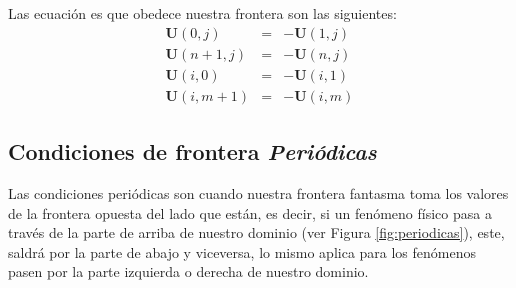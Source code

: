 \documentclass[12pt,a4paper]{book}
\begin{document}
Las ecuación  es que obedece nuestra frontera son las siguientes:
\begin{eqnarray}
\textbf{U}(0,j)&=&-\textbf{U}(1,j) \\
\textbf{U}(n+1,j)&=&-\textbf{U}(n,j) \\
\textbf{U}(i,0)&=&-\textbf{U}(i,1) \\
\textbf{U}(i,m+1)&=&-\textbf{U}(i,m) 
\end{eqnarray}


\subsection{Condiciones de frontera \emph{Periódicas}}
Las condiciones periódicas son cuando nuestra frontera fantasma toma los valores de la frontera opuesta del lado que están, es decir, si un fenómeno físico pasa a través de la parte de arriba de nuestro dominio (ver Figura \ref{fig:periodicas}), este, saldrá por la parte de abajo y viceversa, lo mismo aplica para los fenómenos pasen por la parte izquierda o derecha de nuestro dominio.
 
\end{document}
